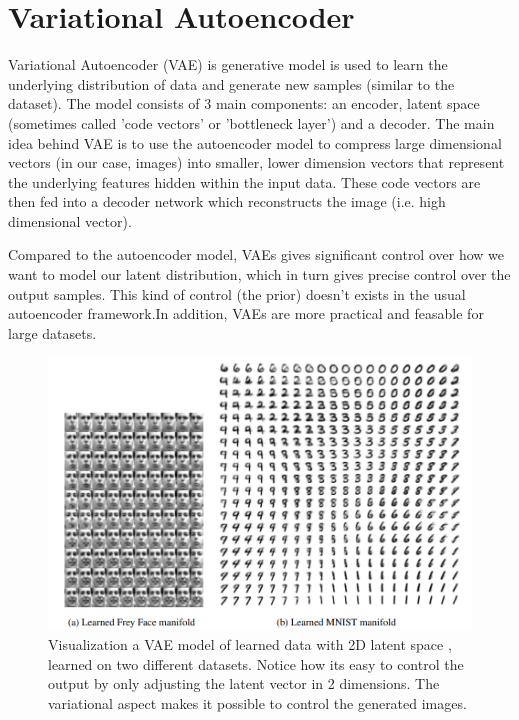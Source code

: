 \section{Variational Autoencoder}
\label{sec:vae}

Variational Autoencoder (VAE) \cite{vae} is generative model is used to learn the underlying distribution of data and generate new samples (similar to the dataset). The model consists of 3 main components: an encoder, latent space (sometimes called 'code vectors' or 'bottleneck layer') and a decoder. The main idea behind VAE is to use the autoencoder model \cite{autoencoder} \cite{autoencoder2} to compress large dimensional vectors (in our case, images) into smaller, lower dimension vectors that represent the underlying features hidden within the input data. These code vectors are then fed into a decoder network which reconstructs the image (i.e. high dimensional vector).

Compared to the autoencoder model, VAEs gives significant control over how we want to model our latent distribution, which in turn gives precise control over the output samples. This kind of control (the prior) doesn't exists in the usual autoencoder framework.In addition, VAEs are more practical and feasable for large datasets. 



\begin{figure}
    \centering
    \includegraphics[scale=0.5]{images/vae.png}
    \caption{Visualization a VAE model of learned data with 2D latent space \cite{vae}, learned on two different datasets. Notice how its easy to control the output by only adjusting the latent vector in 2 dimensions. The variational aspect makes it possible to control the generated images.}
\end{figure}

